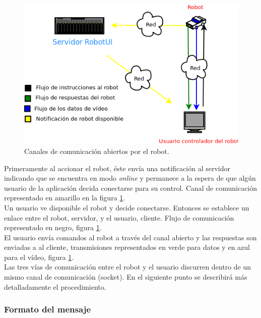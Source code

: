 \begin{figure}[H]
  \begin{center}
    \includegraphics[scale=0.6]{diagramas/flujo-comunicaciones-robot.png}
  \end{center}
  \caption{Canales de comunicación abiertos por el robot.}
  \label{figura:comunicaciones-robot}
\end{figure}


Primeramente al accionar el robot, éste envía una notificación al servidor indicando que se encuentra en modo \emph{online} y permanece a la espera de que algún usuario de la aplicación decida conectarse para su control.
Canal de comunicación representado en amarillo en la figura \ref{figura:comunicaciones-robot}.\\

Un usuario ve disponible el robot y decide conectarse. Entonces se establece un enlace entre el robot, servidor, y el usuario, cliente. Flujo de comunicación representado en negro, figura \ref{figura:comunicaciones-robot}.\\

El usuario envía comandos al robot a través del canal abierto y las respuestas son enviadas a al cliente, transmisiones representados en verde para datos y en azul para el vídeo, figura \ref{figura:comunicaciones-robot}.\\

Las tres vías de comunicación entre el robot y el usuario discurren dentro de un mismo canal de comunicación (socket). En el siguiente punto se describirá más detalladamente el procedimiento.

\subsubsection{ Formato del mensaje}




